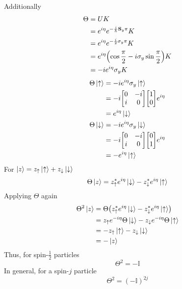 \documentclass[12pt,a4paper,titlepage]{article}
\newcommand{\up}{\uparrow} %
\newcommand{\dn}{\downarrow} %
\begin{document}
Additionally
\begin{equation}
\begin{aligned}
\Theta&=UK\\
&=e^{i\eta}e^{-\frac{i}{\hbar}\vb{S}_{y}\pi}K\\
&=e^{i\eta}e^{-\frac{i}{2}\sigma_{y}\pi}K\\
&=e^{i\eta}\qty(\cos\frac{\pi}{2}-i\sigma_{y}\sin\frac{\pi}{2})K\\
&=-ie^{i\eta}\sigma_{y}K
\end{aligned}
\end{equation}
\begin{equation}
\begin{aligned}
\Theta\ket{\up}&=-ie^{i\eta}\sigma_{y}\ket{\up}\\
&=-i\mqty[0 & -i \\ i & 0]\mqty[1\\0]e^{i\eta}\\
&=e^{i\eta}\ket{\dn}\\
\Theta\ket{\dn}&=-ie^{i\eta}\sigma_{y}\ket{\dn}\\
&=-i\mqty[0 & -i\\ i & 0]\mqty[0\\1]e^{i\eta}\\
&=-e^{i\eta}\ket{\up}
\end{aligned}
\end{equation}
For $\ket{z}=z_{\up}\ket{\up}+z_{\dn}\ket{\dn}$
\begin{equation}
\Theta\ket{z}=z_{\up}^{*}e^{i\eta}\ket{\dn}-z_{\dn}^{*}e^{i\eta}\ket{\up}
\end{equation}
Applying $\Theta$ again
\begin{equation}
\begin{aligned}
\Theta^{2}\ket{z}&=\Theta\qty(z_{\up}^{*}e^{i\eta}\ket{\dn}-z_{\dn}^{*}e^{i\eta}\ket{\up})\\
&=z_{\up}e^{-i\eta}\Theta\ket{\dn}-z_{\dn}e^{-i\eta}\Theta\ket{\up}\\
&=-z_{\up}\ket{\up}-z_{\dn}\ket{\dn}\\
&=-\ket{z}
\end{aligned}
\end{equation}
Thus, for spin-$\frac{1}{2}$ particles
\begin{equation}
\Theta^{2}=-\mathbb{I}
\end{equation}
In general, for a spin-$j$ particle
\begin{equation}
\Theta^{2}=(-\mathbb{I})^{2j}
\end{equation}
\end{document}

